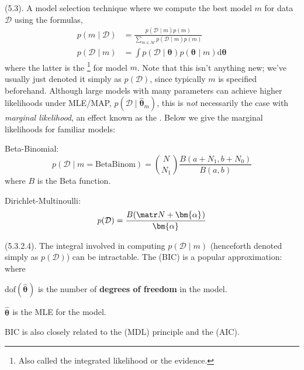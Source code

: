 \documentclass[11pt]{article}
\renewcommand\vec[2][]{\bm{#2}_{#1}}
\newcommand\myspace[1][]{\vspace{#1\bigskipamount}}
\newcommand\p{\Needspace{10\baselineskip} \noindent}
\begin{document}
\myspace
\p {} (5.3). A model selection technique where we compute the best model $m$ for data $\mathcal D$ using the formulas,
\begin{align}
	p(m \mid \mathcal D)
		&= \frac{  p(\mathcal D \mid m) p(m)  }{ \sum_{m \in \mathcal M} p(\mathcal D \mid m) p(m)  } \\
	p(\mathcal D \mid m) 
		&= \int p(\mathcal D \mid \vec\theta) p(\vec\theta \mid m) \mathrm{d}\vec\theta
\end{align}
where the latter is the \footnote{Also called the integrated likelihood or the evidence.} for model $m$. Note that this isn't anything new; we've usually just denoted it simply as $p(\mathcal D)$, since typically $m$ is specified beforehand. Although large models with many parameters can achieve higher likelihoods under MLE/MAP, $p(\mathcal D \mid \vec[m]{\hat\theta})$, this is \textit{not} necessarily the case with \textit{marginal likelihood}, an effect known as the . Below we give the marginal likelihoods for familiar models:
\begin{compactitem}
	\item Beta-Binomial: $$p(\mathcal D \mid m{=}\text{BetaBinom}) = {N \choose N_1} \frac{ B(a + N_1, b + N_0) }{ B(a, b)  }$$ where $B$ is the Beta function.
	
	\item Dirichlet-Multinoulli:
	$$
		p(\mathcal D) = \frac{B(\matr N + \vec\alpha)}{\vec\alpha}
	$$
\end{compactitem}

\myspace
\p {} (5.3.2.4). The integral involved in computing $p(\mathcal D \mid m)$ (henceforth denoted simply as $p(\mathcal D)$) can be intractable. The  (BIC) is a popular approximation:
\graybox{
	\text{BIC} 
		&\triangleq \log p(\mathcal D \mid \vec{\hat{\theta}}) - \onehalf \text{dof}(\vec{\hat\theta}) \log N
		\approx \log p(\mathcal D)
}
where
\begin{compactitem}
	\item $\text{dof}(\vec{\hat{\theta}})$ is the number of \textbf{degrees of freedom} in the model.
	
	\item $\vec{\hat\theta}$ is the MLE for the model. 
\end{compactitem}
BIC is also closely related to the  (MDL) principle and the  (AIC). 
\end{document}
